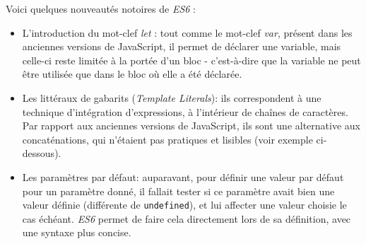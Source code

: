 \documentclass[12pt,a4paper]{article}
\newenvironment{Shaded}{}{}
\newcommand{\KeywordTok}[1]{\textcolor[rgb]{0.00,0.44,0.13}{\textbf{{#1}}}}
\newcommand{\SpecialCharTok}[1]{\textcolor[rgb]{0.25,0.44,0.63}{{#1}}}
\newcommand{\StringTok}[1]{\textcolor[rgb]{0.25,0.44,0.63}{{#1}}}
\newcommand{\VerbatimStringTok}[1]{\textcolor[rgb]{0.25,0.44,0.63}{{#1}}}
\newcommand{\CommentTok}[1]{\textcolor[rgb]{0.38,0.63,0.69}{\textit{{#1}}}}
\newcommand{\OperatorTok}[1]{\textcolor[rgb]{0.40,0.40,0.40}{{#1}}}
\newcommand{\NormalTok}[1]{{#1}}
\begin{document}
  \bigskip

  Voici quelques nouveautés notoires de \emph{ES6} :

  \begin{itemize}
  \item
    L'introduction du mot-clef \emph{let} : tout comme le mot-clef
    \emph{var}, présent dans les anciennes versions de JavaScript, il
    permet de déclarer une variable, mais celle-ci reste limitée à la
    portée d'un bloc - c'est-à-dire que la variable ne peut être utilisée
    que dans le bloc où elle a été déclarée.
  \item
    Les littéraux de gabarits (\emph{Template Literals}): ils
    correspondent à une technique d'intégration d'expressions, à
    l'intérieur de chaînes de caractères. Par rapport aux anciennes
    versions de JavaScript, ils sont une alternative aux concaténations,
    qui n'étaient pas pratiques et lisibles (voir exemple ci-dessous).

  \begin{Shaded}
  \end{Shaded}
  \item
    Les paramètres par défaut: auparavant, pour définir une valeur par
    défaut pour un paramètre donné, il fallait tester si ce paramètre
    avait bien une valeur définie (différente de \texttt{undefined}), et
    lui affecter une valeur choisie le cas échéant. \emph{ES6} permet de
    faire cela directement lors de sa définition, avec une syntaxe plus
    concise.


\end{itemize}
\end{document}
